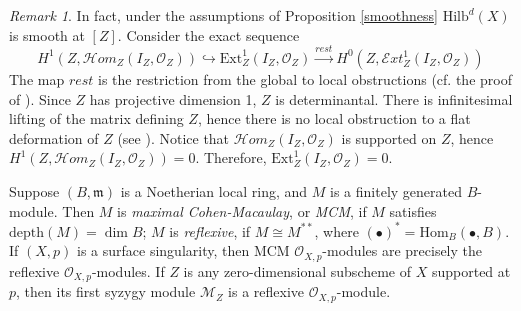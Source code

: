 \documentclass{amsart}[12pt]
\theoremstyle{definition}
\theoremstyle{remark}
\newtheorem{rmk}[theorem]{Remark}
\numberwithin{equation}{section}
\begin{document}
\begin{rmk}
In fact, under the assumptions of Proposition \ref{smoothness} $\mathrm{Hilb}^d(X)$ is smooth at $[Z]$. Consider the exact sequence 
\[
H^1(Z, \mathcal{H}om_Z(I_Z, \mathcal{O}_Z)) \hookrightarrow \mathrm{Ext}^1_Z(I_Z, \mathcal{O}_Z) \xrightarrow{rest} H^0(Z, \mathcal{E}xt^1_Z(I_Z, \mathcal{O}_Z))
\]
The map $rest$ is the restriction from the global to local obstructions (cf. the proof of \cite[Claim I. 2.14.5]{K96}). Since $Z$ has  projective dimension 1, $Z$ is determinantal. There is infinitesimal lifting of the matrix defining $Z$, hence there is no local obstruction to a flat deformation of $Z$ (see \cite[Theorem 5.1]{A76}). Notice that $\mathcal{H}om_Z(I_Z, \mathcal{O}_Z)$ is supported on $Z$, hence $H^1(Z, \mathcal{H}om_Z(I_Z, \mathcal{O}_Z)) = 0$. Therefore, $\mathrm{Ext}^1_Z(I_Z, \mathcal{O}_Z) = 0$. 
\end{rmk}

Suppose $(B, \mathfrak{m})$ is a Noetherian local ring, and $M$ is a finitely generated $B$-module. Then $M$ is \textit{maximal Cohen-Macaulay}, or \textit{MCM}, if $M$ satisfies $\mathrm{depth}(M) = \dim B$; $M$ is \textit{reflexive}, if $M \cong M^{**}$, where $(\bullet)^* = \mathrm{Hom}_B(\bullet, B)$. If $(X, p)$ is a surface singularity, then MCM $\mathcal{O}_{X, p}$-modules are precisely the reflexive $\mathcal{O}_{X, p}$-modules. If $Z$ is any zero-dimensional subscheme of $X$ supported at $p$, then its first syzygy module $\mathcal{M}_Z$ is a reflexive $\mathcal{O}_{X, p}$-module.
 
\end{document}
